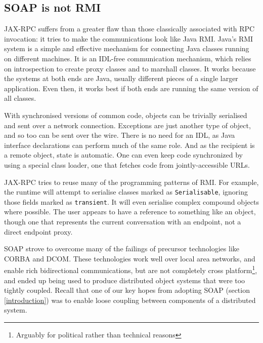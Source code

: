 \subsection{SOAP is not RMI}
\label{objections:soap-not-rmi}

JAX-RPC suffers from a greater flaw than those classically associated
with RPC invocation: it tries to make the communications look like
Java RMI. Java's RMI system is a simple and effective mechanism for
connecting Java classes running on different machines. It is an
IDL-free communication mechanism, which relies on introspection to
create proxy classes and to marshall classes. It works because the
systems at both ends are Java, usually different pieces of a single
larger application. Even then, it works best if both ends are running
the same version of all classes.

With synchronised versions of common code, objects can be trivially
serialised and sent over a network connection. Exceptions are just
another type of object, and so too can be sent over the wire. There is
no need for an IDL, as Java interface declarations can perform much of
the same role. And as the recipient is a remote object, state is
automatic.  One can even keep code synchronized by using a special
class loader, one that fetches code from jointly-accessible URLs.

JAX-RPC tries to reuse many of the programming patterns of RMI. For
example, the runtime will attempt to serialise classes marked as
{\tt Serialisable}, ignoring those fields marked as
{\tt transient}. It will even serialise complex compound objects where
possible. The user appears to have a reference to something like an
object, though one that represents the current conversation with an
endpoint, not a direct endpoint proxy.


SOAP strove to overcome many of the failings of precursor technologies
like CORBA and DCOM. These technologies work well over local area
networks, and enable rich bidirectional communications, but are not
completely cross platform\footnote{Arguably for political rather than
technical reasons}, and ended up being used to produce distributed
object systems that were too tightly coupled. Recall that one of our
key hopes from adopting SOAP (section \ref{introduction}) was to
enable loose coupling between components of a distributed system.


